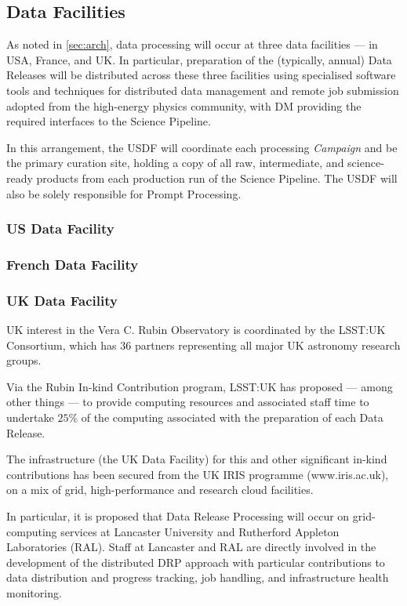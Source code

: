 \subsection{Data Facilities} \label{sec:datafacilities}

As noted in \ref{sec:arch}, data processing will occur at three data facilities --- in USA, France, and UK. In particular, preparation of the (typically, annual) Data Releases will be distributed across these three facilities using specialised software tools and techniques for distributed data management and remote job submission adopted from the high-energy physics community, with DM providing the required interfaces to the Science Pipeline.

In this arrangement, the USDF will coordinate each processing {\em Campaign} and be the primary curation site, holding a copy of all raw, intermediate, and science-ready products from each production run of the Science Pipeline. The USDF will also be solely responsible for Prompt Processing.

\subsubsection{US Data Facility} \label{sec:ukdf}

\subsubsection{French Data Facility} \label{sec:ukdf}

\subsubsection{UK Data Facility} \label{sec:ukdf}

UK interest in the Vera C. Rubin Observatory is coordinated by the LSST:UK Consortium, which has 36 partners representing all major UK astronomy research groups.

Via the Rubin In-kind Contribution program, LSST:UK has proposed --- among other things --- to provide computing resources and associated staff time to undertake $25\%$ of the computing associated with the preparation of each Data Release.

The infrastructure (the UK Data Facility) for this and other significant in-kind contributions has been secured from the UK IRIS programme (www.iris.ac.uk), on a mix of grid, high-performance and research cloud facilities.

In particular, it is proposed that Data Release Processing will occur on grid-computing services at Lancaster University and Rutherford Appleton Laboratories (RAL). Staff at Lancaster and RAL are directly involved in the development of the distributed DRP approach with particular contributions to data distribution and progress tracking, job handling, and infrastructure health monitoring.

